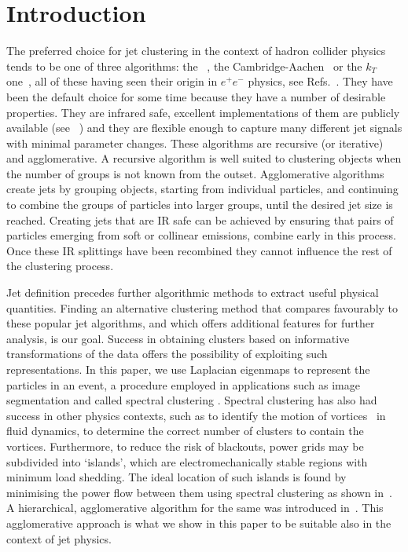 \section{Introduction}\label{sec:JetClustering}

The preferred choice for jet clustering in the context of hadron collider physics tends to be one of three algorithms:  
the \antikt{}~\cite{Cacciari:2008gp, Catani:1993hr, Moretti:1998qx},
the Cambridge-Aachen~\cite{Dokshitzer:1997in,Wobisch:1998wt} or the $k_T$  one~\cite{Ellis:1993tq},
all of these having seen  their origin in $e^+e^-$ physics, see  Refs.~\cite{Sterman:1977wj,Bethke:1991wk,Catani:1991hj,Moretti:1998qx}.
They have been the default choice for some time because they have a number of desirable properties.
They are infrared safe, excellent implementations of them are publicly available (see \fastjet{}~\cite{Cacciari:2011ma})
and they are flexible enough to capture many different jet signals with minimal parameter changes.
These algorithms are recursive (or iterative) and agglomerative.
A recursive algorithm is well suited to clustering objects when the number of groups is not known from the outset.
Agglomerative algorithms create jets by grouping objects,
starting from individual particles,
and continuing to combine the groups of particles into larger groups,
until the desired jet size is reached.
Creating jets that are  IR safe
can be achieved by ensuring that pairs of  particles emerging from soft or collinear emissions, combine early in this process.
Once these IR splittings have been recombined they
cannot influence the rest of the clustering process.

Jet definition precedes further algorithmic methods to extract useful
physical quantities. Finding an alternative clustering method that compares favourably to
these popular jet algorithms, and which offers additional features for further analysis, is our goal.
Success in obtaining clusters based on informative transformations of the data
offers the possibility of exploiting such representations.
In this paper, we use Laplacian eigenmaps \cite{Belkin:2003_unfound4} to represent the particles
in an event, a procedure employed in applications such as image segmentation \cite{Shi:1997_unfound595}
and called spectral clustering \cite{Ng:2001_unfound543}.
Spectral clustering has also had success in other physics contexts, such as to identify the motion
of vortices~\cite{Hadjighasem:2016_unfound447} in fluid dynamics,
to determine the correct number of clusters to contain the vortices.
Furthermore, to reduce the risk of blackouts, power grids may be subdivided into `islands',
which are
electromechanically stable regions with minimum load shedding.
The ideal location of such islands is found by minimising the power flow between them using spectral clustering as shown in~\cite{HaoLi:2005_unfound114}.  A hierarchical, agglomerative algorithm for the same was introduced in~\cite{RJSanchezGarcia:2014_unfound420}.
This agglomerative approach is what we show in this paper to be suitable also in the context of jet physics.

